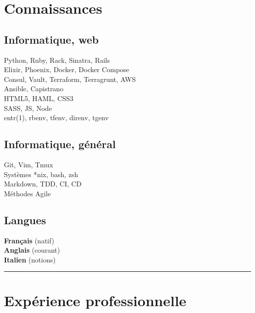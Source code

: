 \documentclass[a4paper,11pt]{article}
\newcommand{\breakvspace}[1]{\pagebreak[2]\vspace{#1}\pagebreak[2]}
\newcommand{\nobreakvspace}[1]{\nopagebreak[4]\vspace{#1}\nopagebreak[4]}
\newcommand{\spacedhrule}[2]{\breakvspace{#1}\hrule\nobreakvspace{#2}}
\begin{document}
\section*{Connaissances}
  \begin{minipage}[t]{0.29\textwidth}
    \subsection*{Informatique, web}
    Python, Ruby, Rack, Sinatra, Rails\\
    Elixir, Phoenix, Docker, Docker Compose \\
    Consul, Vault, Terraform, Terragrunt, AWS \\
    Ansible, Capistrano \\
    HTML5, HAML, CSS3 \\
    SASS, JS, Node \\
    entr(1), rbenv, tfenv, direnv, tgenv
  \end{minipage}
  \hspace{0.035\textwidth}
  \vrule
  \hspace{0.035\textwidth}
  \begin{minipage}[t]{0.28\textwidth}
    \subsection*{Informatique, général}
    Git, Vim, Tmux\\
    Systèmes *nix, bash, zsh\\
    Markdown, TDD, CI, CD\\
    Méthodes Agile \\
  \end{minipage}
  \hspace{0.035\textwidth}
  \vrule
  \hspace{0.035\textwidth}
  \begin{minipage}[t]{0.28\textwidth}
    \subsection*{Langues}
    \textbf{Français} (natif)\\
    \textbf{Anglais} (courant)\\
    \textbf{Italien} (notions)
  \end{minipage}


\spacedhrule{1.5em}{-0.4em}

\section*{Expérience professionnelle}
\end{document}
